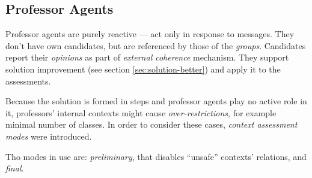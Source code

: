 \documentclass[../../ThesisDoc]{subfiles}
\begin{document}
\providecommand{\rootdir}{../..}


\subsection{Professor Agents}
Professor agents are purely reactive --- act only in response to messages.
They don't have own candidates, but are referenced by those of the \emph{groups}.
Candidates report their \emph{opinions} as part of \emph{external coherence}
mechanism. They support solution improvement (see section \ref{sec:solution-better})
and apply it to the assessments.

Because the solution is formed in steps and professor agents play no active role
in it, professors' internal contexts might cause \emph{over-restrictions}, for
example minimal number of classes. In order to consider these cases,
\emph{context assessment modes} were introduced.

Tho modes in use are: \emph{preliminary}, that disables ``unsafe'' contexts' relations,
and \emph{final}.
\end{document}
